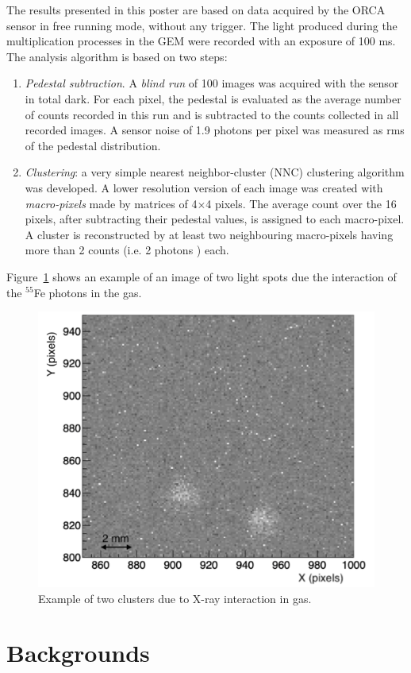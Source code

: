 \documentclass[a4paper]{jpconf}
\begin{document}
The results presented in this poster are based on data 
acquired by the ORCA sensor 
in free running mode, without any trigger. The light produced during the multiplication processes in the GEM were recorded with an exposure of 100 ms.
The analysis algorithm is based on two steps:
\begin{enumerate}
    \item {\it Pedestal subtraction}. A {\it blind run} of 100 images
      was acquired with the sensor in total dark. For each pixel, the
      pedestal is evaluated as the average number of counts recorded
      in this run and is subtracted to the counts collected in all
      recorded images. A sensor noise of 1.9 photons per pixel was
      measured as rms of the pedestal distribution.
    \item {\it Clustering}: a very simple nearest neighbor-cluster
      (NNC) clustering algorithm was developed. A lower resolution
      version of each image was created with {\it macro-pixels} made
      by matrices of 4$\times$4 pixels.  The average count over the 16
      pixels, after subtracting their pedestal values, is assigned to
      each macro-pixel.  A cluster is reconstructed by at least two
      neighbouring macro-pixels having more than 2 counts (i.e. 2
      photons \cite{bib:jinst_orange1}) each.
\end{enumerate}

Figure~\ref{fig:spot} shows an example of an image of two light 
spots due the interaction of the $^{55}$Fe photons in the gas.

\begin{figure}[htbp]
\centering
\includegraphics[width=.45\textwidth]{spot_xRay_841.png}
\caption{Example of two clusters due to X-ray interaction in gas.}
\label{fig:spot}
\end{figure}

\section{Backgrounds}
\label{sec:bkg}
\end{document}

